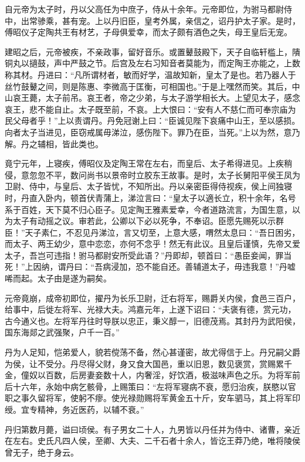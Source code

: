 \documentclass[]{article}
\begin{document}
自元帝为太子时，丹以父高任为中庶子，侍从十余年。元帝即位，为驸马都尉侍中，出常骖乘，甚有宠。上以丹旧臣，皇考外属，亲信之，诏丹护太子家。是时，傅昭仪子定陶共王有材艺，子母俱爱幸，而太子颇有酒色之失，母王皇后无宠。

建昭之后，元帝被疾，不亲政事，留好音乐。或置鼙鼓殿下，天子自临轩槛上，隤铜丸以擿鼓，声中严鼓之节。后宫及左右习知音者莫能为，而定陶王亦能之，上数称其材。丹进曰：``凡所谓材者，敏而好学，温故知新，皇太了是也。若乃器人于丝竹鼓鼙之间，则是陈惠、李微高于匡衡，可相国也。''于是上嘿然而笑。其后，中山哀王薨，太子前吊。哀王者，帝之少弟，与太子游学相长大。上望见太子，感念哀王，悲不能自止。太子既至前，不哀。上大恨曰：``安有人不慈仁而可奉宗庙为民父母者乎！''上以责谓丹。丹免冠谢上曰：``臣诚见陛下哀痛中山王，至以感损。向者太子当进见，臣窃戒属毋涕泣，感伤陛下。罪乃在臣，当死。''上以为然，意乃解。丹之辅相，皆此类也。

竟宁元年，上寝疾，傅昭仪及定陶王常在左右，而皇后、太子希得进见。上疾稍侵，意忽忽不平，数问尚书以景帝时立胶东王故事。是时，太子长舅阳平侯王凤为卫尉、侍中，与皇后、太子皆忧，不知所出。丹以亲密臣得侍视疾，侯上间独寝时，丹直入卧内，顿首伏青蒲上，涕泣言曰：``皇太子以適长立，积十余年，名号系于百姓，天下莫不归心臣子。见定陶王雅素爱幸，今者道路流言，为国生意，以为太子有动摇之议。审若此，公卿以下必以死争，不奉诏。臣愿先赐死以示群臣！''天子素仁，不忍见丹涕泣，言又切至，上意大感，喟然太息曰：``吾日困劣，而太子、两王幼少，意中恋恋，亦何不念乎！然无有此议。且皇后谨慎，先帝又爱太子，吾岂可违指！驸马都尉安所受此语？''丹即却，顿首曰：``愚臣妾闻，罪当死！''上因纳，谓丹曰：``吾病浸加，恐不能自还。善辅道太子，毋违我意！''丹嘘唏而起。太子由是遂为嗣矣。

元帝竟崩，成帝初即位，擢丹为长乐卫尉，迁右将军，赐爵关内侯，食邑三百户，给事中，后徙左将军、光禄大夫。鸿嘉元年，上遂下诏曰：``夫褒有德，赏元功，古今通义也。左将军丹往时导朕以忠正，秉义醇一，旧德茂焉。其封丹为武阳侯，国东海郯之武强聚，户千一百。''

丹为人足知，恺弟爱人，貌若傥荡不备，然心甚谨密，故尤得信于上。丹兄嗣父爵为侯，让不受分。丹尽得父财，身又食大国邑，重以旧恩，数见褒赏，赏赐累千金，僮奴以百数，后房妻妾数十人，内奢淫，好饮酒，极滋味声色之乐。为将军前后十六年，永始中病乞骸骨，上赐策曰：``左将军寝病不衰，愿归治疾，朕愍以官职之事久留将军，使躬不瘳。使光禄勋赐将军黄金五十斤，安车驷马，其上将军印绶。宜专精神，务近医药，以辅不衰。''

丹归第数月薨，谥曰顷侯。有子男女二十人，九男皆以丹任并为侍中、诸曹，亲近在左右。史氏凡四人侯，至卿、大夫、二千石者十余人，皆讫王莽乃绝，唯将陵侯曾无子，绝于身云。
\end{document}

